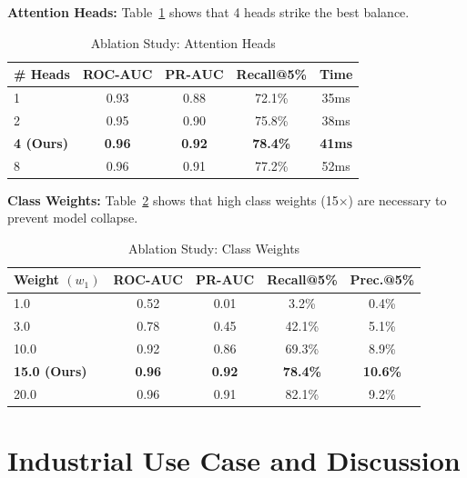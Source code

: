 \textbf{Attention Heads:} Table~\ref{tab:ablation_heads} shows that 4 heads strike the best balance.

\begin{table}[t]
\centering
\caption{Ablation Study: Attention Heads}
\label{tab:ablation_heads}
\begin{tabular}{@{}lcccc@{}}
\toprule
\textbf{\# Heads} & \textbf{ROC-AUC} & \textbf{PR-AUC} & \textbf{Recall@5\%} & \textbf{Time} \\
\midrule
1 & 0.93 & 0.88 & 72.1\% & 35ms \\
2 & 0.95 & 0.90 & 75.8\% & 38ms \\
\textbf{4 (Ours)} & \textbf{0.96} & \textbf{0.92} & \textbf{78.4\%} & \textbf{41ms} \\
8 & 0.96 & 0.91 & 77.2\% & 52ms \\
\bottomrule
\end{tabular}
\end{table}

\textbf{Class Weights:} Table~\ref{tab:ablation_weights} shows that high class weights (15$\times$) are necessary to prevent model collapse.

\begin{table}[t]
\centering
\caption{Ablation Study: Class Weights}
\label{tab:ablation_weights}
\begin{tabular}{@{}lcccc@{}}
\toprule
\textbf{Weight $(w_1)$} & \textbf{ROC-AUC} & \textbf{PR-AUC} & \textbf{Recall@5\%} & \textbf{Prec.@5\%} \\
\midrule
1.0 & 0.52 & 0.01 & 3.2\% & 0.4\% \\
3.0 & 0.78 & 0.45 & 42.1\% & 5.1\% \\
10.0 & 0.92 & 0.86 & 69.3\% & 8.9\% \\
\textbf{15.0 (Ours)} & \textbf{0.96} & \textbf{0.92} & \textbf{78.4\%} & \textbf{10.6\%} \\
20.0 & 0.96 & 0.91 & 82.1\% & 9.2\% \\
\bottomrule
\end{tabular}
\end{table}

\section{Industrial Use Case and Discussion}
\label{sec:discussion}


